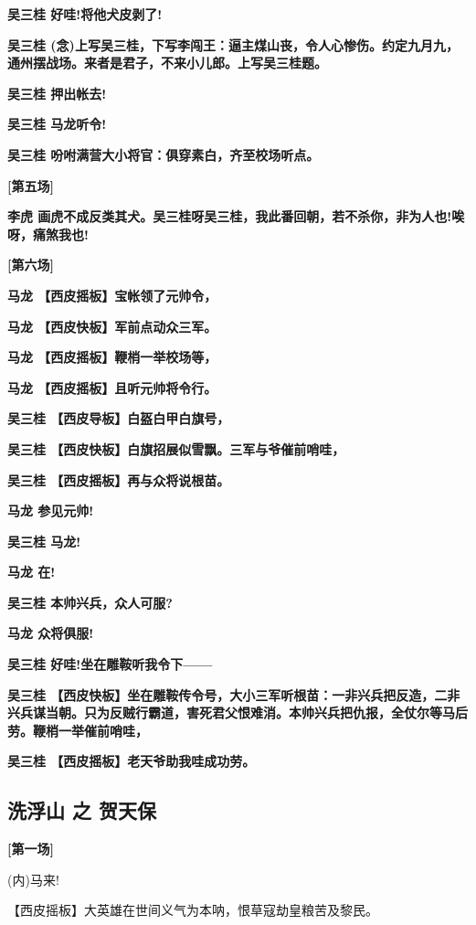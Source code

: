 \textbf{吴三桂 好哇!将他犬皮剥了!}

\textbf{吴三桂
(念)上写吴三桂，下写李闯王：逼主煤山丧，令人心惨伤。约定九月九，通州摆战场。来者是君子，不来小儿郎。上写吴三桂题。}

\textbf{吴三桂 押出帐去!}

\textbf{吴三桂 马龙听令!}

\textbf{吴三桂 吩咐满营大小将官：俱穿素白，齐至校场听点。}

\textbf{{[}第五场{]}}

\textbf{李虎
画虎不成反类其犬。吴三桂呀吴三桂，我此番回朝，若不杀你，非为人也!唉呀，痛煞我也!}

\textbf{{[}第六场{]}}

\textbf{马龙 【西皮摇板】宝帐领了元帅令，}

\textbf{马龙 【西皮快板】军前点动众三军。}

\textbf{马龙 【西皮摇板】鞭梢一举校场等，}

\textbf{马龙 【西皮摇板】且听元帅将令行。}

\textbf{吴三桂 【西皮导板】白盔白甲白旗号，}

\textbf{吴三桂 【西皮快板】白旗招展似雪飘。三军与爷催前哨哇，}

\textbf{吴三桂 【西皮摇板】再与众将说根苗。}

\textbf{马龙 参见元帅!}

\textbf{吴三桂 马龙!}

\textbf{马龙 在!}

\textbf{吴三桂 本帅兴兵，众人可服?}

\textbf{马龙 众将俱服!}

\textbf{吴三桂 好哇!坐在雕鞍听我令下------}

\textbf{吴三桂
【西皮快板】坐在雕鞍传令号，大小三军听根苗：一非兴兵把反造，二非兴兵谋当朝。只为反贼行霸道，害死君父恨难消。本帅兴兵把仇报，全仗尔等马后劳。鞭梢一举催前哨哇，}

\textbf{吴三桂 【西皮摇板】老天爷助我哇成功劳。}

\newpage
\hypertarget{ux6d17ux6d6eux5c71-ux4e4b-ux8d3aux5929ux4fdd}{%
\subsection{洗浮山 之
贺天保}\label{ux6d17ux6d6eux5c71-ux4e4b-ux8d3aux5929ux4fdd}}

\textbf{{[}第一场{]}}

(内)马来!

【西皮摇板】大英雄在世间义气为本呐，恨草寇劫皇粮苦及黎民。

